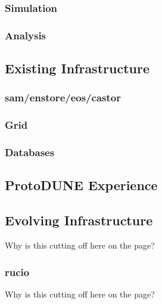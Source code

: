 \subsubsection{Simulation}
\label{ch:exec-comp-mod-use-sim}


\subsubsection{Analysis}
\label{ch:exec-comp-mod-use-anls}


\subsection{Existing Infrastructure}	
\label{ch:exec-comp-mod-infr}


\subsubsection{sam/enstore/eos/castor}
\label{ch:exec-comp-mod-infr-stor}


\subsubsection{Grid}
\label{ch:exec-comp-mod-infr-gr}


\subsubsection{Databases}
\label{ch:exec-comp-mod-infr-db}


\subsection{ProtoDUNE Experience}	
\label{ch:exec-comp-mod-pdune}


\subsection{Evolving Infrastructure}	
\label{ch:exec-comp-mod-evlv}
Why is this cutting off here on the page?

\subsubsection{rucio}
\label{ch:exec-comp-mod-evlv-ruc}
Why is this cutting off here on the page?

